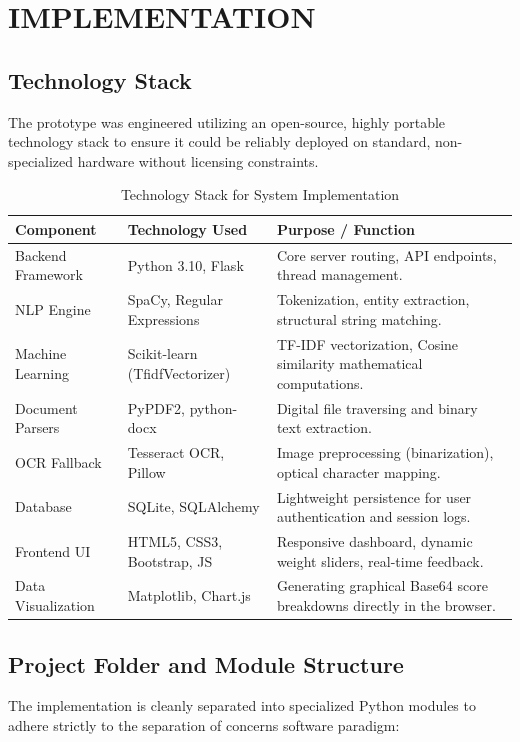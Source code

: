 \chapter{IMPLEMENTATION}

\section{Technology Stack}
The prototype was engineered utilizing an open-source, highly portable technology stack to ensure it could be reliably deployed on standard, non-specialized hardware without licensing constraints.

\begin{table}[H]
\centering
\caption{Technology Stack for System Implementation}
\begin{tabularx}{\textwidth}{p{}p{}Y}
\toprule
\textbf{Component} & \textbf{Technology Used} & \textbf{Purpose / Function}\\
\midrule
Backend Framework & Python 3.10, Flask & Core server routing, API endpoints, thread management.\\
NLP Engine & SpaCy, Regular Expressions & Tokenization, entity extraction, structural string matching.\\
Machine Learning & Scikit-learn (TfidfVectorizer) & TF-IDF vectorization, Cosine similarity mathematical computations.\\
Document Parsers & PyPDF2, python-docx & Digital file traversing and binary text extraction.\\
OCR Fallback & Tesseract OCR, Pillow & Image preprocessing (binarization), optical character mapping.\\
Database & SQLite, SQLAlchemy & Lightweight persistence for user authentication and session logs.\\
Frontend UI & HTML5, CSS3, Bootstrap, JS & Responsive dashboard, dynamic weight sliders, real-time feedback.\\
Data Visualization & Matplotlib, Chart.js & Generating graphical Base64 score breakdowns directly in the browser.\\
\bottomrule
\end{tabularx}
\end{table}

\section{Project Folder and Module Structure}

The implementation is cleanly separated into specialized Python modules to adhere strictly to the separation of concerns software paradigm:

